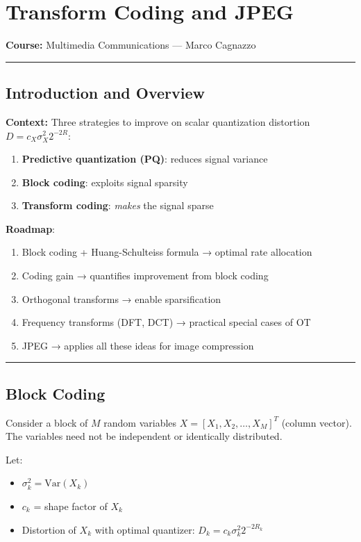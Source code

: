 \chapter{Transform Coding and JPEG}

\textbf{Course:} Multimedia Communications — Marco Cagnazzo

\bigskip\hrule\bigskip

\section{Introduction and Overview}

\textbf{Context:} Three strategies to improve on scalar quantization distortion $D = c_X \sigma_X^2 2^{-2R}$:

\begin{enumerate}
\item \textbf{Predictive quantization (PQ)}: reduces signal variance
\item \textbf{Block coding}: exploits signal sparsity
\item \textbf{Transform coding}: \textit{makes} the signal sparse
\end{enumerate}

\textbf{Roadmap}:
\begin{enumerate}
\item Block coding + Huang-Schulteiss formula → optimal rate allocation
\item Coding gain → quantifies improvement from block coding
\item Orthogonal transforms → enable sparsification
\item Frequency transforms (DFT, DCT) → practical special cases of OT
\item JPEG → applies all these ideas for image compression
\end{enumerate}

\bigskip\hrule\bigskip

\section{Block Coding}

Consider a block of $M$ random variables $X = [X_1, X_2, \ldots, X_M]^T$ (column vector). The variables need not be independent or identically distributed.

Let:
\begin{itemize}
\item $\sigma_k^2 = \text{Var}(X_k)$
\item $c_k$ = shape factor of $X_k$
\item Distortion of $X_k$ with optimal quantizer: $D_k = c_k \sigma_k^2 2^{-2R_k}$
\end{itemize}

